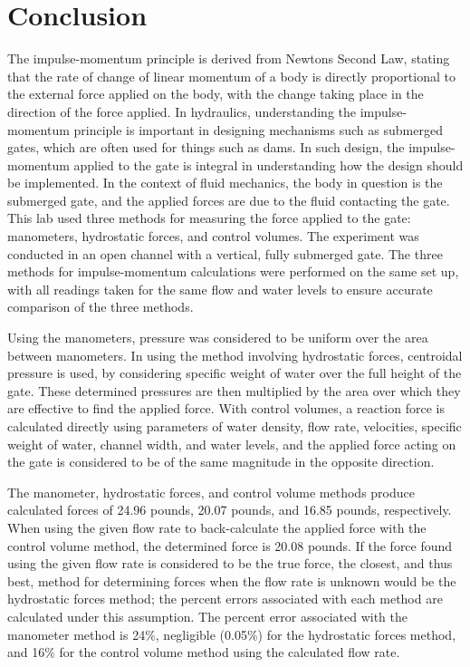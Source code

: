 \documentclass{article}
\begin{document}
\section{Conclusion}
\par The impulse-momentum principle is derived from Newtons Second Law, stating that the rate of change of linear momentum of a body is directly proportional to the external force applied on the body, with the change taking place in the direction of the force applied. In hydraulics, understanding the impulse-momentum principle is important in designing mechanisms such as submerged gates, which are often used for things such as dams. In such design, the impulse-momentum applied to the gate is integral in understanding how the design should be implemented. In the context of fluid mechanics, the body in question is the submerged gate, and the applied forces are due to the fluid contacting the gate. 
This lab used three methods for measuring the force applied to the gate: manometers, hydrostatic forces, and control volumes. The experiment was conducted in an open channel with a vertical, fully submerged gate. The three methods for impulse-momentum calculations were performed on the same set up, with all readings taken for the same flow and water levels to ensure accurate comparison of the three methods. 
\par Using the manometers, pressure was considered to be uniform over the area between manometers. In using the method involving hydrostatic forces, centroidal pressure is used, by considering specific weight of water over the full height of the gate. These determined pressures are then multiplied by the area over which they are effective to find the applied force. With control volumes, a reaction force is calculated directly using parameters of water density, flow rate, velocities, specific weight of water, channel width, and water levels, and the applied force acting on the gate is considered to be of the same magnitude in the opposite direction. 
\par The manometer, hydrostatic forces, and control volume methods produce calculated forces of 24.96 pounds, 20.07 pounds, and 16.85 pounds, respectively. When using the given flow rate to back-calculate the applied force with the control volume method, the determined force is 20.08 pounds. If the force found using the given flow rate is considered to be the true force, the closest, and thus best, method for determining forces when the flow rate is unknown would be the hydrostatic forces method; the percent errors associated with each method are calculated under this assumption. The percent error associated with the manometer method is 24\%, negligible (0.05\%) for the hydrostatic forces method, and 16\% for the control volume method using the calculated flow rate. 
\end{document}
